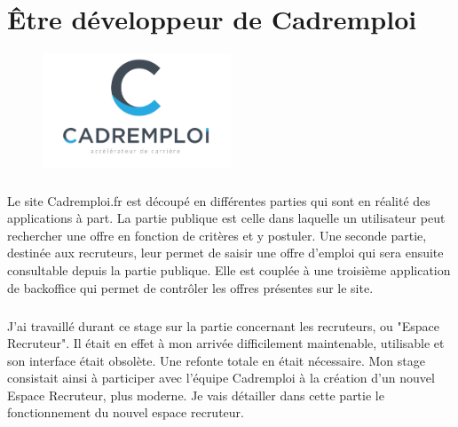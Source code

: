 
\chapter{Être développeur de Cadremploi} %

\label{apports} %


\begin{figure}[h]
  \begin{center}
    \hspace*{-1in}
    \includegraphics[width=0.5\textwidth]{Pictures/CE_logo.png}
  \end{center}
\end{figure}
\paragraph{}
Le site Cadremploi.fr est découpé en différentes parties qui sont en réalité des applications à part.
La partie publique est celle dans laquelle un utilisateur peut rechercher une offre en fonction de critères et y postuler.
Une seconde partie, destinée aux recruteurs, leur permet de saisir une offre d'emploi qui sera ensuite consultable depuis la partie publique.
Elle est couplée à une troisième application de backoffice qui permet de contrôler les offres présentes sur le site.
\paragraph{}
J'ai travaillé durant ce stage sur la partie concernant les recruteurs, ou "Espace Recruteur".
Il était en effet à mon arrivée difficilement maintenable, utilisable et son interface était obsolète.
Une refonte totale en était nécessaire.
Mon stage consistait ainsi à participer avec l'équipe Cadremploi à la création d'un nouvel Espace Recruteur, plus moderne.
Je vais détailler dans cette partie le fonctionnement du nouvel espace recruteur.







